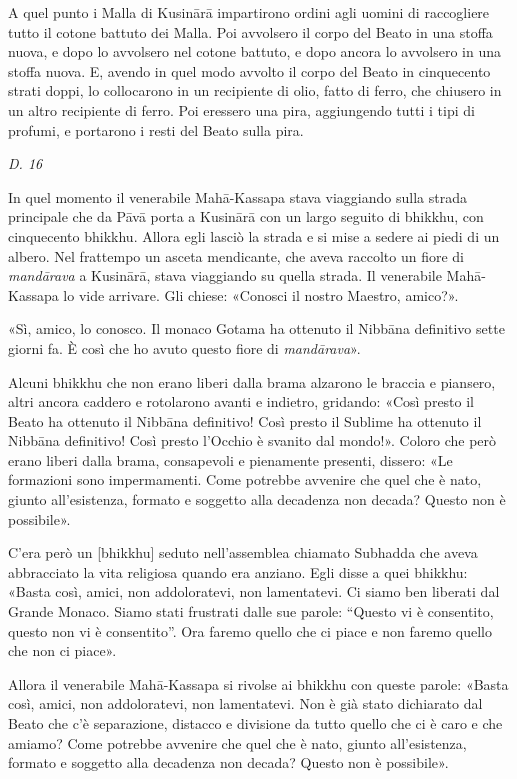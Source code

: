 A quel punto i Malla di Kusinārā impartirono ordini agli uomini di
raccogliere tutto il cotone battuto dei Malla. Poi avvolsero il corpo
del Beato in una stoffa nuova, e dopo lo avvolsero nel cotone battuto, e
dopo ancora lo avvolsero in una stoffa nuova. E, avendo in quel modo
avvolto il corpo del Beato in cinquecento strati doppi, lo collocarono
in un recipiente di olio, fatto di ferro, che chiusero in un altro
recipiente di ferro. Poi eressero una pira, aggiungendo tutti i tipi di
profumi, e portarono i resti del Beato sulla pira.


\emph{D. 16}


In quel momento il venerabile Mahā-Kassapa stava viaggiando sulla strada
principale che da Pāvā porta a Kusinārā con un largo seguito di bhikkhu,
con cinquecento bhikkhu. Allora egli lasciò la strada e si mise a sedere
ai piedi di un albero. Nel frattempo un asceta mendicante, che aveva
raccolto un fiore di \emph{mandārava} a Kusinārā, stava viaggiando su quella
strada. Il venerabile Mahā-Kassapa lo vide arrivare. Gli chiese:
«Conosci il nostro Maestro, amico?».


«Sì, amico, lo conosco. Il monaco Gotama ha ottenuto il Nibbāna
definitivo sette giorni fa. È così che ho avuto questo fiore di
\emph{mandārava}».


Alcuni bhikkhu che non erano liberi dalla brama alzarono le braccia e
piansero, altri ancora caddero e rotolarono avanti e indietro, gridando:
«Così presto il Beato ha ottenuto il Nibbāna definitivo! Così presto il
Sublime ha ottenuto il Nibbāna definitivo! Così presto l’Occhio è
svanito dal mondo!». Coloro che però erano liberi dalla brama,
consapevoli e pienamente presenti, dissero: «Le formazioni sono
impermamenti. Come potrebbe avvenire che quel che è nato, giunto
all’esistenza, formato e soggetto alla decadenza non decada? Questo non
è possibile».


C’era però un [bhikkhu] seduto nell’assemblea chiamato Subhadda che
aveva abbracciato la vita religiosa quando era anziano. Egli disse a
quei bhikkhu: «Basta così, amici, non addoloratevi, non lamentatevi. Ci
siamo ben liberati dal Grande Monaco. Siamo stati frustrati dalle sue
parole: “Questo vi è consentito, questo non vi è consentito”. Ora faremo
quello che ci piace e non faremo quello che non ci piace».


Allora il venerabile Mahā-Kassapa si rivolse ai bhikkhu con queste
parole: «Basta così, amici, non addoloratevi, non lamentatevi. Non è già
stato dichiarato dal Beato che c’è separazione, distacco e divisione da
tutto quello che ci è caro e che amiamo? Come potrebbe avvenire che quel
che è nato, giunto all’esistenza, formato e soggetto alla decadenza non
decada? Questo non è possibile».


